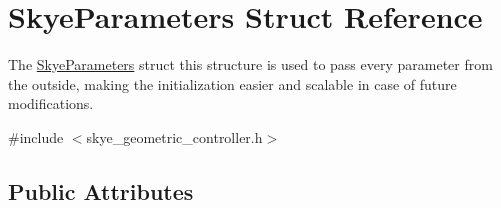 \hypertarget{struct_skye_parameters}{\section{Skye\-Parameters Struct Reference}
\label{struct_skye_parameters}
}


The \hyperlink{struct_skye_parameters}{Skye\-Parameters} struct this structure is used to pass every parameter from the outside, making the initialization easier and scalable in case of future modifications.  




{\ttfamily \#include $<$skye\-\_\-geometric\-\_\-controller.\-h$>$}

\subsection*{Public Attributes}
